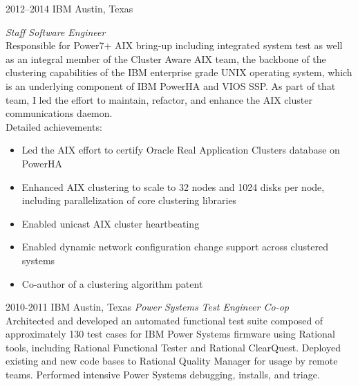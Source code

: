 \documentclass{friggeri-cv} %
\begin{document}
\begin{entrylist}
\entry
{2012--2014}
{IBM}
{Austin, Texas}
{\emph{Staff Software Engineer} \\
Responsible for Power7+ AIX bring-up including integrated system test as well as an integral member of the
Cluster Aware AIX team, the backbone of the clustering capabilities of the IBM enterprise grade UNIX operating system,
which is an underlying component of IBM PowerHA and VIOS SSP. As part of that team, I led the effort to maintain, refactor,
and enhance the AIX cluster communications daemon. \\
Detailed achievements:
\begin{itemize}
\item Led the AIX effort to certify Oracle Real Application Clusters database on PowerHA
\item Enhanced AIX clustering to scale to 32 nodes and 1024 disks per node, including parallelization of core clustering libraries
\item Enabled unicast AIX cluster heartbeating
\item Enabled dynamic network configuration change support across clustered systems
\item Co-author of a clustering algorithm patent 
\end{itemize}}
\end{entrylist}
\begin{entrylist}
\entry
{2010-2011}
{IBM}
{Austin, Texas}
{\emph{Power Systems Test Engineer Co-op} \\
Architected and developed an automated functional test suite composed of approximately 130 test cases for IBM Power Systems
firmware using Rational tools, including Rational Functional Tester and Rational ClearQuest. Deployed existing and new code bases to Rational Quality Manager for usage by remote teams. Performed intensive Power Systems debugging, installs, and triage.}
\end{entrylist}
\end{document}
